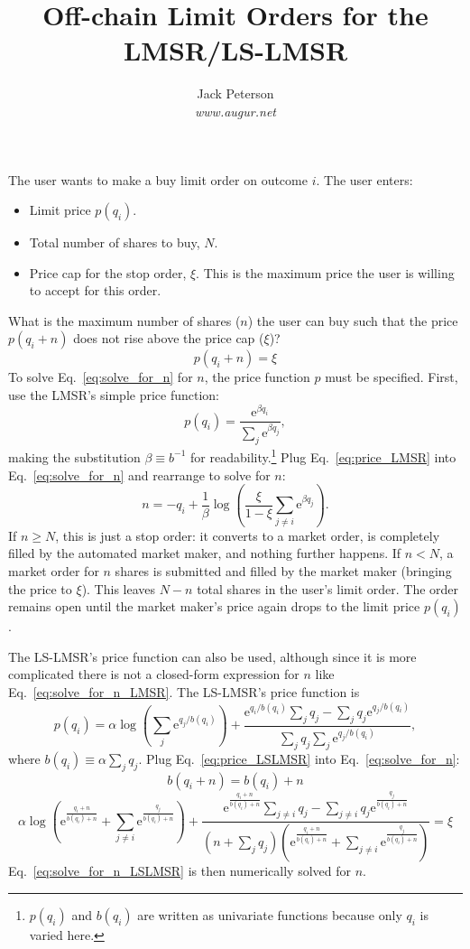 \documentclass[floatfix,reprint,nofootinbib,amsmath,amssymb,epsfig,pre,floats,letterpaper,groupedaffiliation]{revtex4}
\newcommand{\beq}{\begin{equation}}
\newcommand{\eeq}{\end{equation}}
\newcommand{\e}{\mathrm{e}}
\begin{document}
\title{Off-chain Limit Orders for the LMSR/LS-LMSR}

\author{Jack Peterson\\\emph{www.augur.net}}

\maketitle

The user wants to make a buy limit order on outcome $i$.  The user enters:
\begin{itemize}
\item Limit price $p(q_i)$.
\item Total number of shares to buy, $N$.
\item Price cap for the stop order, $\xi$.  This is the maximum price the user is willing to accept for this order.
\end{itemize}
What is the maximum number of shares ($n$) the user can buy such that the price $p(q_i+n)$ does not rise above the price cap ($\xi$)?
\beq\label{eq:solve_for_n}
p\left(q_i+n\right)=\xi
\eeq
To solve Eq.~\ref{eq:solve_for_n} for $n$, the price function $p$ must be specified.  First, use the LMSR's simple price function:
\beq\label{eq:price_LMSR}
p\left(q_i\right)=\frac{\e^{\beta q_i}}{\sum_{j} \e^{\beta q_j}},
\eeq
making the substitution $\beta\equiv b^{-1}$ for readability.\footnote{$p(q_i)$ and $b(q_i)$ are written as univariate functions because only $q_i$ is varied here.}  Plug Eq.~\ref{eq:price_LMSR} into Eq.~\ref{eq:solve_for_n} and rearrange to solve for $n$:
\beq\label{eq:solve_for_n_LMSR}
n = -q_i + \frac{1}{\beta} \log\left(\frac{\xi}{1-\xi} \sum_{j\ne i} \e^{\beta q_j}\right).
\eeq
If $n \ge N$, this is just a stop order: it converts to a market order, is completely filled by the automated market maker, and nothing further happens.  If $n < N$, a market order for $n$ shares is submitted and filled by the market maker (bringing the price to $\xi$).  This leaves $N-n$ total shares in the user's limit order.  The order remains open until the market maker's price again drops to the limit price $p(q_i)$.

The LS-LMSR's price function can also be used, although since it is more complicated there is not a closed-form expression for $n$ like Eq.~\ref{eq:solve_for_n_LMSR}.  The LS-LMSR's price function is
\beq\label{eq:price_LSLMSR}
p\left(q_i\right) = \alpha \log\left(\sum_j \e^{q_j/b(q_i)}\right) + \frac{\displaystyle \e^{q_i/b(q_i)} \sum_j q_j - \sum_j q_j \e^{q_j/b(q_i)}}{\displaystyle\sum_j q_j \sum_j \e^{q_j/b(q_i)}},
\eeq
where $b\left(q_i\right) \equiv \alpha \sum_j q_j$.  Plug Eq.~\ref{eq:price_LSLMSR} into Eq.~\ref{eq:solve_for_n}:
\beq
b\left(q_i + n\right) = b\left(q_i\right) + n
\eeq
\beq\label{eq:solve_for_n_LSLMSR}
\alpha \log\left(\e^{\frac{q_i + n}{b(q_i)+n}} + \sum_{j\ne i} \e^{\frac{q_j}{b(q_i)+n}}\right) +
\frac{
     \displaystyle \e^{\frac{q_i+n}{b(q_i)+n}} \sum_{j\ne i} q_j - \sum_{j\ne i} q_j \e^{\frac{q_j}{b(q_i)+n}}
	}{
	\displaystyle \left(n+\sum_j q_j\right)
	\left(\e^{\frac{q_i+n}{b(q_i)+n}} + \sum_{j\ne i} \e^{\frac{q_j}{b(q_i)+n}}\right)
	} = \xi
\eeq
Eq.~\ref{eq:solve_for_n_LSLMSR} is then numerically solved for $n$.
\end{document}

